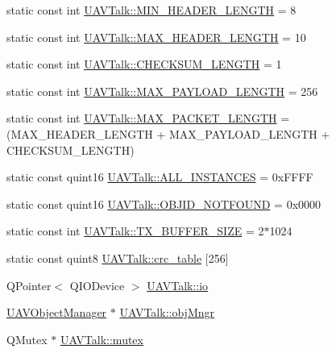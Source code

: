 \begin{DoxyCompactItemize}
static const int \hyperlink{group___u_a_v_talk_plugin_ga0d20c7ff6e0eedb2ab1243c6bf957fd3}{\-U\-A\-V\-Talk\-::\-M\-I\-N\-\_\-\-H\-E\-A\-D\-E\-R\-\_\-\-L\-E\-N\-G\-T\-H} = 8
\item 
static const int \hyperlink{group___u_a_v_talk_plugin_ga279763a8abdcb2fae7cb36916b36c1a8}{\-U\-A\-V\-Talk\-::\-M\-A\-X\-\_\-\-H\-E\-A\-D\-E\-R\-\_\-\-L\-E\-N\-G\-T\-H} = 10
\item 
static const int \hyperlink{group___u_a_v_talk_plugin_ga094abac2d747f187a4b22bea1dd28ec0}{\-U\-A\-V\-Talk\-::\-C\-H\-E\-C\-K\-S\-U\-M\-\_\-\-L\-E\-N\-G\-T\-H} = 1
\item 
static const int \hyperlink{group___u_a_v_talk_plugin_gac89ca6073b8cf1479a5e2468b3691db9}{\-U\-A\-V\-Talk\-::\-M\-A\-X\-\_\-\-P\-A\-Y\-L\-O\-A\-D\-\_\-\-L\-E\-N\-G\-T\-H} = 256
\item 
static const int \hyperlink{group___u_a_v_talk_plugin_gab5a37286c5e8b676d49e134f26444a0c}{\-U\-A\-V\-Talk\-::\-M\-A\-X\-\_\-\-P\-A\-C\-K\-E\-T\-\_\-\-L\-E\-N\-G\-T\-H} = (\-M\-A\-X\-\_\-\-H\-E\-A\-D\-E\-R\-\_\-\-L\-E\-N\-G\-T\-H + \-M\-A\-X\-\_\-\-P\-A\-Y\-L\-O\-A\-D\-\_\-\-L\-E\-N\-G\-T\-H + \-C\-H\-E\-C\-K\-S\-U\-M\-\_\-\-L\-E\-N\-G\-T\-H)
\item 
static const quint16 \hyperlink{group___u_a_v_talk_plugin_ga71e922ea4fa7f9e0a9fe89ebdd2fe75c}{\-U\-A\-V\-Talk\-::\-A\-L\-L\-\_\-\-I\-N\-S\-T\-A\-N\-C\-E\-S} = 0x\-F\-F\-F\-F
\item 
static const quint16 \hyperlink{group___u_a_v_talk_plugin_gaa627c86aec4d382c9744541688fb66ef}{\-U\-A\-V\-Talk\-::\-O\-B\-J\-I\-D\-\_\-\-N\-O\-T\-F\-O\-U\-N\-D} = 0x0000
\item 
static const int \hyperlink{group___u_a_v_talk_plugin_gaa84c0f2f2a83872a6f82f00969d9ddff}{\-U\-A\-V\-Talk\-::\-T\-X\-\_\-\-B\-U\-F\-F\-E\-R\-\_\-\-S\-I\-Z\-E} = 2$\ast$1024
\item 
static const quint8 \hyperlink{group___u_a_v_talk_plugin_gac5c5c810a2edb31ed325bf2d54e1b289}{\-U\-A\-V\-Talk\-::crc\-\_\-table} \mbox{[}256\mbox{]}
\item 
\-Q\-Pointer$<$ \-Q\-I\-O\-Device $>$ \hyperlink{group___u_a_v_talk_plugin_ga0047f38af98ba4de8e38500e10b73046}{\-U\-A\-V\-Talk\-::io}
\item 
\hyperlink{class_u_a_v_object_manager}{\-U\-A\-V\-Object\-Manager} $\ast$ \hyperlink{group___u_a_v_talk_plugin_ga096422f1ff46ea45de07a92c41827aa5}{\-U\-A\-V\-Talk\-::obj\-Mngr}
\item 
\-Q\-Mutex $\ast$ \hyperlink{group___u_a_v_talk_plugin_ga2dea39cdabf26ef85d0b26583e21e60b}{\-U\-A\-V\-Talk\-::mutex}

\end{DoxyCompactItemize}
